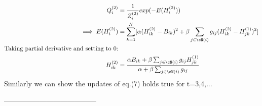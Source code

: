 \begin{align*}
 Q_i^{(2)} &= \frac{1}{Z_{i}^{(2)}}exp(-E(H_i^{(2)})) \\
 \implies E(H_i^{(2)}) &= \sum_{k=1}^{N}[\alpha(H_{ik}^{(2)} - B_{ik})^2 + \beta\sum_{j\in\cN(i)}g_{ij}(H_{ik}^{(2)} - H_{jk}^{(1)})^2]\\
 \text{Taking partial derivative and setting to 0:}\\
 H_{ik}^{(2)} &= \frac{\alpha B_{ik} +  \beta\sum_{j\in\cN(i)}g_{ij}H_{jk}^{(1)}}{\alpha + \beta\sum_{j\in\cN(i)}g_{ij}}\\
\end{align*}
Similarly we can show the updates of eq.(7) holds true for t=3,4,...
\begin{center}
 ---------------------------------------
\end{center}

